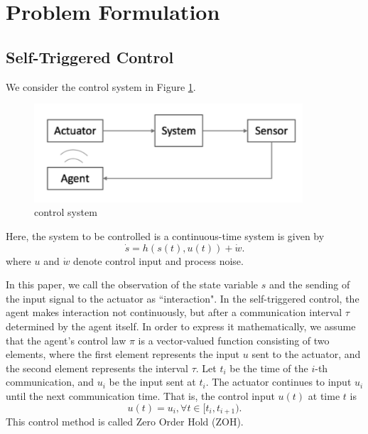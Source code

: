 \documentclass[english, dvipdfmx]{ampmt}             %
\begin{document}
\section{Problem Formulation}
\subsection{Self-Triggered Control}
We consider the control system in Figure \ref{image}.
\begin{figure}[t]
	\centering
 	\includegraphics[width=10cm]{event.png}
 	\caption{control system} \label{image}
\end{figure}
Here, the system to be controlled is a continuous-time system is given by
\begin{equation}
	\dot{s} = h(s(t),u(t)) + \dot{w}\label{continuous_system}.
\end{equation}
where $u$ and $\dot{w}$ denote control input and process noise.\par
In this paper, we call the observation of the state variable $s$ and the sending of the input signal to the actuator as ``interaction". In the self-triggered control, the agent makes interaction not continuously, but after a communication interval $\tau$ determined by the agent itself. In order to express it mathematically, we assume that the agent's control law $\pi$ is a vector-valued function consisting of two elements, where the first element represents the input $u$ sent to the actuator, and the second element represents the interval $\tau$. Let $t_i$ be the time of the $i$-th communication, and $u_i$ be the input sent at $t_i$. The actuator continues to input $u_i$ until the next communication time. That is, the control input $u(t)$ at time $t$ is 
\begin{equation}
	u(t) = u_i, \forall t \in [t_i, t_{i+1}).
\end{equation} 
This control method is called Zero Order Hold (ZOH).
\end{document}
